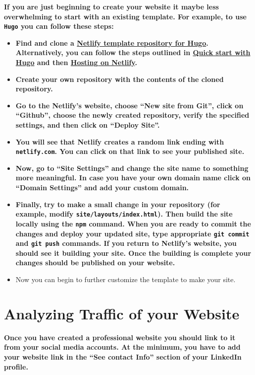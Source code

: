 \documentclass[11pt]{article}
\begin{document}
\textbf{If you are just beginning to create your website it maybe less overwhelming to start with an existing template. For example, to use {\tt Hugo} you can follow these steps:}
\begin{itemize}
	\item \textbf{Find and clone a \href{https://github.com/netlify-templates/victor-hugo}{Netlify template repository for Hugo}. Alternatively, you can follow the steps outlined in \href{https://gohugo.io/getting-started/quick-start/}{Quick start with Hugo} and then \href{https://gohugo.io/hosting-and-deployment/hosting-on-netlify/}{Hosting on Netlify}.} 
	\item \textbf{Create your own repository with the contents of the cloned repository. }
	\item \textbf{Go to the Netlify's website, choose ``New site from Git'', click on ``Github'', choose the newly created repository, verify the specified settings, and then click on ``Deploy Site''.}
	\item \textbf{You will see that Netlify creates a random link ending with {\tt netlify.com}. You can click on that link to see your published site.}
	\item \textbf{Now, go to ``Site Settings'' and change the site name to something more meaningful. In case you have your own domain name click on ``Domain Settings'' and add your custom domain.}
	\item \textbf{Finally, try to make a small change in your repository (for example, modify {\tt site/layouts/index.html}). Then build the site locally using the {\tt npm} command. When you are ready to commit the changes and deploy your updated site, type appropriate {\tt git commit} and {\tt git push} commands. If you return to Netlify's website, you should see it building your site. Once the building is complete your changes should be published on your website.}
	\item Now you can begin to further customize the template to make your site.
\end{itemize}


\vspace{-0.05in}
\section*{Analyzing Traffic of your Website}
\textbf{Once you have created a professional website you should link to it from your social media accounts. At the minimum, you have to add your website link in the ``See contact Info'' section of your LinkedIn profile.}
\end{document}
